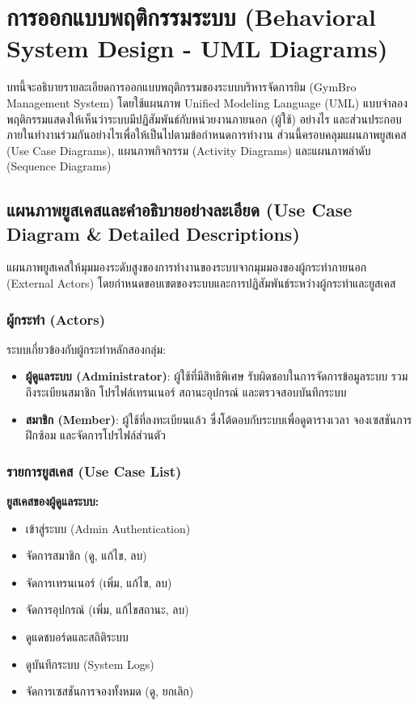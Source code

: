 \chapter{การออกแบบพฤติกรรมระบบ (Behavioral System Design - UML Diagrams)}

บทนี้จะอธิบายรายละเอียดการออกแบบพฤติกรรมของระบบบริหารจัดการยิม (GymBro Management System) โดยใช้แผนภาพ Unified Modeling Language (UML) แบบจำลองพฤติกรรมแสดงให้เห็นว่าระบบมีปฏิสัมพันธ์กับหน่วยงานภายนอก (ผู้ใช้) อย่างไร และส่วนประกอบภายในทำงานร่วมกันอย่างไรเพื่อให้เป็นไปตามข้อกำหนดการทำงาน ส่วนนี้ครอบคลุมแผนภาพยูสเคส (Use Case Diagrams), แผนภาพกิจกรรม (Activity Diagrams) และแผนภาพลำดับ (Sequence Diagrams)

\section{แผนภาพยูสเคสและคำอธิบายอย่างละเอียด (Use Case Diagram \& Detailed Descriptions)}
แผนภาพยูสเคสให้มุมมองระดับสูงของการทำงานของระบบจากมุมมองของผู้กระทำภายนอก (External Actors) โดยกำหนดขอบเขตของระบบและการปฏิสัมพันธ์ระหว่างผู้กระทำและยูสเคส

\subsection{ผู้กระทำ (Actors)}
ระบบเกี่ยวข้องกับผู้กระทำหลักสองกลุ่ม:
\begin{itemize}
    \item \textbf{ผู้ดูแลระบบ (Administrator)}: ผู้ใช้ที่มีสิทธิพิเศษ รับผิดชอบในการจัดการข้อมูลระบบ รวมถึงระเบียนสมาชิก โปรไฟล์เทรนเนอร์ สถานะอุปกรณ์ และตรวจสอบบันทึกระบบ
    \item \textbf{สมาชิก (Member)}: ผู้ใช้ที่ลงทะเบียนแล้ว ซึ่งโต้ตอบกับระบบเพื่อดูตารางเวลา จองเซสชันการฝึกซ้อม และจัดการโปรไฟล์ส่วนตัว
\end{itemize}

\subsection{รายการยูสเคส (Use Case List)}
\textbf{ยูสเคสของผู้ดูแลระบบ:}
\begin{itemize}
    \item เข้าสู่ระบบ (Admin Authentication)
    \item จัดการสมาชิก (ดู, แก้ไข, ลบ)
    \item จัดการเทรนเนอร์ (เพิ่ม, แก้ไข, ลบ)
    \item จัดการอุปกรณ์ (เพิ่ม, แก้ไขสถานะ, ลบ)
    \item ดูแดชบอร์ดและสถิติระบบ
    \item ดูบันทึกระบบ (System Logs)
    \item จัดการเซสชันการจองทั้งหมด (ดู, ยกเลิก)
\end{itemize}

